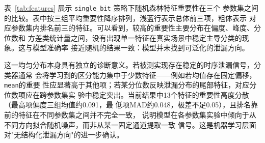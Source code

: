 \documentclass[a4paper,fontset=none]{ctexart}
\begin{document}
表~\ref{tab:features} 展示 \texttt{single\_bit} 策略下随机森林特征重要性在三个
参数集之间的比较。表中按三组平均重要性降序排列，浅蓝行表示总体前三项，粗体表示
对应参数集内排名前三的特征。可以看到，较高的重要性主要分布在偏度、峰度、分位数和
方差类统计量之间，没有出现单一特征在真实场景中稳定主导分类的现象。这与模型准确率
接近随机的结果一致：模型并未找到可泛化的泄漏方向。

\begin{table}[H]
  \centering
  \caption{\texttt{single\_bit} 策略下三个参数集的随机森林特征重要性（5轮均值）。}
  \label{tab:features}
\end{table}

这一均匀分布本身具有独立的诊断意义。若被测实现存在稳定的时序泄漏信号，分类器通常
会将学习到的区分能力集中于少数特征——例如若均值存在固定偏移，\texttt{mean}的重要
性应显著高于其他项；若某分位数反映泄漏分布的尾部特征，对应分位数项应在跨参数集实
验中稳定突出。当前结果中13个特征的重要性高度分散（最高项偏度三组均值约0.091，最
低项MAD约0.048，极差不足0.05），且排名靠前的特征在不同参数集之间并不完全一致，
说明模型在各参数集实验中倾向于从不同方向拟合随机噪声，而非从某一固定通道提取一致
信号。这是机器学习层面对"无结构化泄漏方向"的进一步确认。
\end{document}
